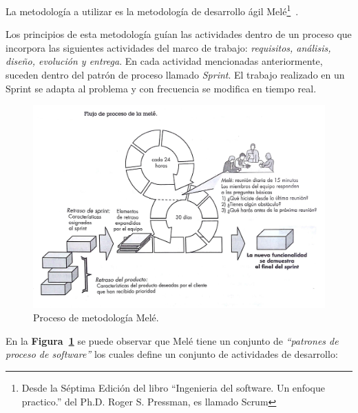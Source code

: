 

La metodología a utilizar es la metodología de desarrollo ágil Melé\footnote{Desde la Séptima Edición del libro ``Ingenieria del software. Un enfoque practico.'' del Ph.D. Roger S. Pressman, es llamado Scrum }~\cite{7}.

Los principios de esta metodología guían las actividades dentro de un proceso que incorpora las siguientes actividades del marco de trabajo: \emph{requisitos, análisis, diseño, evolución y entrega}. En cada actividad mencionadas anteriormente, suceden dentro del patrón de proceso llamado \emph{Sprint}. El trabajo realizado en un Sprint se adapta al problema y con frecuencia se modifica en tiempo real.

\begin{figure}[!hb]
	\includegraphics[width=\textwidth]{Imagenes/mele.jpg}
	\caption{\label{procesoMele} Proceso de metodología Melé.}
\end{figure}

En la \textbf{Figura~\ref{procesoMele}} se puede observar que Melé tiene un conjunto de \emph{``patrones de proceso de software''} los cuales define un conjunto de actividades de desarrollo:

